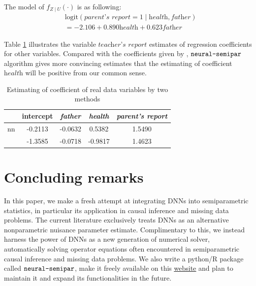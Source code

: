 \documentclass[11pt]{article}
\def\neurosemi{{\normalfont\texttt{neural-semipar}}}
\begin{document}
\noindent The model of $f_{Z\mid U}(\cdot)$ is as following:
\begin{equation}
    \begin{split}
        &\text{logit}(\textit{parent's report}=
        1\mid\textit{health},\textit{father})\\&=-2.106+0.890\textit{health}+0.623\textit{father}
    \end{split}
\end{equation}

Table \ref{real_data} illustrates the variable $\textit{teacher's report}$ estimates of regression coefficients for other variables. Compared with the coefficients given by \cite{zhao2021versatile}, $\neurosemi$ algorithm gives more convincing estimates that the estimating of coefficient $\textit{health}$ will be positive from our common sense.

\begin{table}[htbp]
    \centering
    \caption{Estimating of coefficient of real data variables by two methods}
    \vspace{0.3cm}
    \begin{tabular}{c|cccc}
    \hline
         & intercept & \textit{father} & \textit{health} & \textit{parent's report} \\
    \hline
        nn & -0.2113 & -0.0632 & 0.5382 & 1.5490 \\
        \hline
        \cite{zhao2021versatile} & -1.3585 & -0.0718 & -0.9817 & 1.4623\\
        \hline
    \end{tabular}
    \label{real_data}
\end{table}

\section{Concluding remarks}
\label{sec:conclude}

In this paper, we make a fresh attempt at integrating DNNs into semiparametric statistics, in particular its application in causal inference and missing data problems. The current literature \citep{farrell2021deep, chen2020causal, xu2022deepmed, kompa2022deep, ghasempour2023convolutional} exclusively treats DNNs as an alternative nonparametric nuisance parameter estimate. Complimentary to this, we instead harness the power of DNNs as a new generation of numerical solver, automatically solving operator equations often encountered in semiparametric causal inference and missing data problems. We also write a python/R package called $\neurosemi$, make it freely available on this \href{https://linliu-stats.github.io/}{\underline{website}} and plan to maintain it and expand its functionalities in the future.
\end{document}
